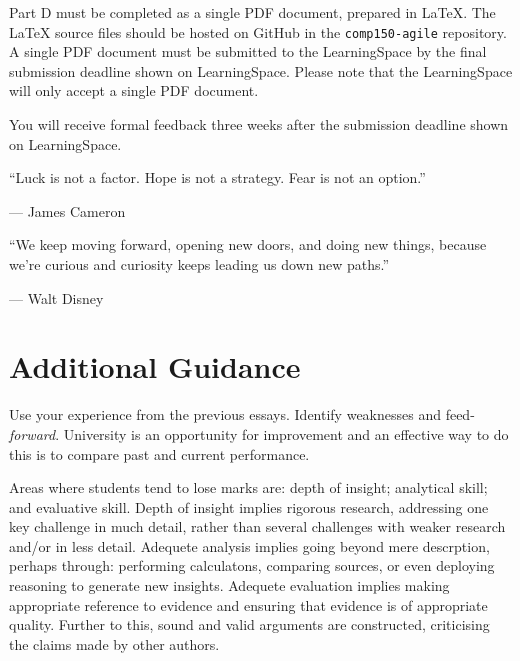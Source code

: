 \documentclass{../fal_assignment}
\begin{document}
Part D must be completed as a single PDF document, prepared in LaTeX. The LaTeX source files should be hosted on GitHub in the \texttt{comp150-agile} repository. A single PDF document must be submitted to the LearningSpace by the final submission deadline shown on LearningSpace. Please note that the LearningSpace will only accept a single PDF document.

You will receive formal feedback three weeks after the submission deadline shown on LearningSpace.

\begin{marginquote}
    ``Luck is not a factor. Hope is not a strategy. Fear is not an option.''
    
    --- James Cameron
    
    \marginquoterule

        ``We keep moving forward, opening new doors, and doing new things, because we're curious and curiosity keeps leading us down new paths.''
    
    --- Walt Disney
\end{marginquote}


\section*{Additional Guidance}

Use your experience from the previous essays. Identify weaknesses and feed-\textit{forward}. University is an opportunity for improvement and an effective way to do this is to compare past and current performance.

Areas where students tend to lose marks are: depth of insight; analytical skill; and evaluative skill. Depth of insight implies rigorous research, addressing one key challenge in much detail, rather than several challenges with weaker research and/or in less detail. Adequete analysis implies going beyond mere descrption, perhaps through: performing calculatons, comparing sources, or even deploying reasoning to generate new insights. Adequete evaluation implies making appropriate reference to evidence and ensuring that evidence is of appropriate quality. Further to this, sound and valid arguments are constructed, criticising the claims made by other authors.
\end{document}
